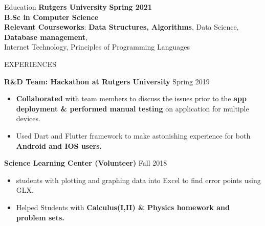 \documentclass{resume}
\begin{document}

\begin{rSection}{Education}
{\bf Rutgers University}  \hfill {\bf Spring 2021}\\
{\bf B.Sc in Computer Science}\\
{ \bf Relevant Courseworks}: {\bf Data Structures, Algorithms}, Data Science, {\bf Database management},\\
Internet Technology, Principles of Programming Languages 
\end{rSection}

\begin{rSection}{EXPERIENCES}


\textbf{R\&D Team: Hackathon at Rutgers University} \hfill Spring 2019
 \begin{itemize}
    \itemsep -2pt {} 
     \item \text \textbf{Collaborated} with team members to discuss the issues prior to the {\bf app deployment  \&  performed manual testing} on application for multiple devices.
     \item Used Dart and  Flutter framework to make astonishing experience for both {\bf Android and IOS users.}
 \end{itemize}
 
\textbf{Science Learning Center (Volunteer)} \hfill Fall 2018
 \begin{itemize}
    \itemsep -2pt {} 
     \item {} students with plotting and graphing data into Excel to find error points using GLX.
     \item Helped Students with {\bf Calculus(I,II) \& Physics homework and problem sets.}
 \end{itemize}
\end{rSection} 

\end{document}
